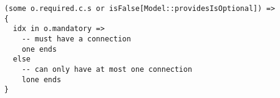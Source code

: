 \lstset{frame=tb, aboveskip=12pt, belowskip=-3pt, breaklines=true, basicstyle=\small\ttfamily, tabsize=2, mathescape=true}
\begin{lstlisting}[caption={wellformed\_components.als, lines 175-183}, label=alloy:WF_PORT_PROVIDES_ONLY, captionpos=b]
(some o.required.c.s or isFalse[Model::providesIsOptional]) =>
{
  idx in o.mandatory =>
    -- must have a connection
    one ends
  else
    -- can only have at most one connection
    lone ends
}
\end{lstlisting}